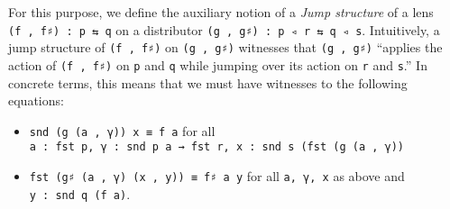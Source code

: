 \documentclass[
  11pt,
  oneside,
  article]{memoir}
\providecommand{\tightlist}{%
  \setlength{\itemsep}{0pt}\setlength{\parskip}{0pt}}
\theoremstyle{definition}
\theoremstyle{plain}
\newcommand{\0}{\textsf{0}}
\newcommand{\1}{\tn{\textsf{1}}}
\begin{document}
For this purpose, we define the auxiliary notion of a \emph{Jump
structure} of a lens \texttt{(f\ ,\ f♯)\ :\ p\ ⇆\ q} on a distributor
\texttt{(g\ ,\ g♯)\ :\ p\ ◃\ r\ ⇆\ q\ ◃\ s}. Intuitively, a jump
structure of \texttt{(f\ ,\ f♯)} on \texttt{(g\ ,\ g♯)} witnesses that
\texttt{(g\ ,\ g♯)} ``applies the action of \texttt{(f\ ,\ f♯)} on
\texttt{p} and \texttt{q} while jumping over its action on \texttt{r}
and \texttt{s}.'' In concrete terms, this means that we must have
witnesses to the following equations:

\begin{itemize}
\tightlist
\item
  \texttt{snd\ (g\ (a\ ,\ γ))\ x\ ≡\ f\ a} for all
  \texttt{a\ :\ fst\ p,\ γ\ :\ snd\ p\ a\ →\ fst\ r,\ x\ :\ snd\ s\ (fst\ (g\ (a\ ,\ γ))}
\item
  \texttt{fst\ (g♯\ (a\ ,\ γ)\ (x\ ,\ y))\ ≡\ f♯\ a\ y} for all
  \texttt{a,\ γ,\ x} as above and \texttt{y\ :\ snd\ q\ (f\ a)}.
\end{itemize}
\end{document}
